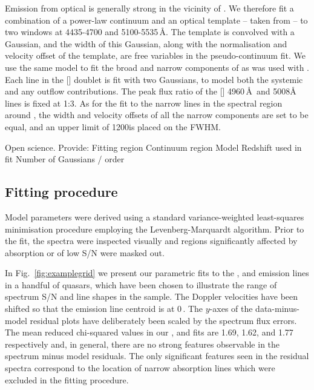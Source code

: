 Emission from optical  is generally strong in the vicinity of \hbns.
We therefore fit a combination of a power-law continuum and an optical  template -- taken from \citet{boroson92} -- to two windows at 4435-4700 and 5100-5535\,\AA. 
The  template is convolved with a Gaussian, and the width of this Gaussian, along with the normalisation and velocity offset of the  template, are free variables in the pseudo-continuum fit.
We use the same model to fit the broad and narrow components of \hb as was used with \hans. 
Each line in the [] doublet is fit with two Gaussians, to model both the systemic and any outflow contributions. 
The peak flux ratio of the [] 4960\,\AA\, and 5008\AA\, lines is fixed at 1:3. 
As for the fit to the narrow lines in the spectral region around \hans, the width and velocity offsets of all the narrow components are set to be equal, and an upper limit of 1200\kms is placed on the FWHM. 

Open science. Provide: 
Fitting region
Continuum region
Model 
Redshift used in fit 
Number of Gaussians / order 

\subsection{Fitting procedure}

Model parameters were derived using a standard variance-weighted least-squares minimisation procedure employing the Levenberg-Marquardt algorithm. 
Prior to the fit, the spectra were inspected visually and regions significantly affected by absorption or of low S/N were masked out.

In Fig.~\ref{fig:examplegrid} we present our parametric fits to the , \ha and \hb emission lines in a handful of quasars, which have been chosen to illustrate the range of spectrum S/N and line shapes in the sample.  
The Doppler velocities have been shifted so that the \ha emission line centroid is at 0\,\kms. 
The $y$-axes of the data-minus-model residual plots have deliberately been scaled by the spectrum flux errors.
The mean reduced chi-squared values in our \hans, \hb and  fits are 1.69, 1.62, and 1.77 respectively and, in general, there are no strong features observable in the spectrum minus model residuals. 
The only significant features seen in the residual  spectra correspond to the location of narrow absorption lines which were excluded in the fitting procedure.

